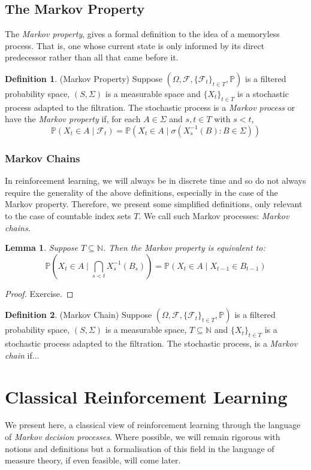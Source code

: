 \documentclass[a4paper,11pt,oneside]{book}
\theoremstyle{plain}
\newtheorem{lem}[thm]{Lemma}
\theoremstyle{definition}
\newtheorem{defn}{Definition}[section]
\begin{document}
\section{The Markov Property}
The \emph{Markov property}, gives a formal definition to the idea of a memoryless process. That is, one whose current state is only informed by its direct predecessor rather than all that came before it.
\begin{defn}{(Markov Property)}
Suppose $(\Omega,\mathcal{F},\{\mathcal{F}_t\}_{t \in T},\mathbb{P})$ is a filtered probability space, $(S, \Sigma)$ is a measurable space and $\{X_t\}_{t\in T}$ is a stochastic process adapted to the filtration. The stochastic process is a \emph{Markov process} or have the \emph{Markov property} if, for each $A \in \Sigma$ and $s,t \in T$ with $s<t$, \[\mathbb{P}(X_t \in A \mid \mathcal{F}_t) = \mathbb{P}(X_t \in A \mid \sigma({X_s^{-1}(B):B \in \Sigma}))\]
\end{defn}
\subsection{Markov Chains}
In reinforcement learning, we will always be in discrete time and so do not always require the generality of the above definitions, especially in the case of the Markov property. Therefore, we present some simplified definitions, only relevant to the case of countable index sets $T$. We call such Markov processes: \emph{Markov chains}.
\begin{lem}
Suppose $T \subseteq \mathbb{N}$. Then the Markov property is equivalent to:
\[\mathbb{P}\left(X_t \in A \mid \bigcap_{s<t} X_s^{-1}(B_s)\right) = \mathbb{P}(X_t \in A \mid X_{t-1} \in B_{t-1})\]
\end{lem}
\begin{proof}
Exercise.
\end{proof}
\begin{defn}(Markov Chain)
Suppose $(\Omega,\mathcal{F},\{\mathcal{F}_t\}_{t \in T},\mathbb{P})$ is a filtered probability space, $(S, \Sigma)$ is a measurable space, $T \subseteq \mathbb{N}$ and $\{X_t\}_{t\in T}$ is a stochastic process adapted to the filtration. The stochastic process, is a \emph{Markov chain} if...
\end{defn}
\chapter{Classical Reinforcement Learning}
We present here, a classical view of reinforcement learning through the language of \emph{Markov decision processes}. Where possible, we will remain rigorous with notions and definitions but a formalisation of this field in the language of measure theory, if even feasible, will come later.
\end{document}
